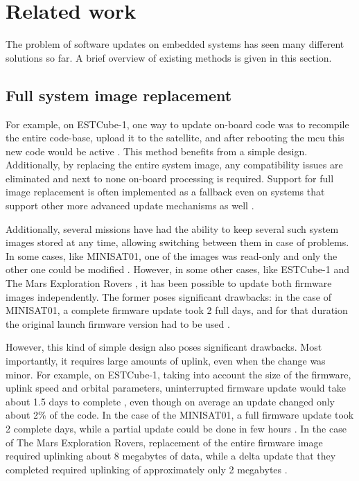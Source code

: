 \newpage
\section{Related work}
\label{s:relatedwork}

The problem
of software updates on embedded systems has seen many different solutions so far. A brief overview of existing methods is given in this section.

\subsection{Full system image replacement}

For example, on ESTCube-1, one way to update on-board code was to recompile the entire code-base, upload it to the satellite, and after rebooting the \gls{mcu} this new code would be active \cite{Suenter2016}. This method benefits from a simple design. Additionally, by replacing the entire system image, any compatibility issues are eliminated and next to none on-board processing is required. Support for full image replacement is often implemented as a fallback even on systems that support other more advanced update mechanisms as well \cite{Tarbe2013,Greco2005,Garrido1998}.

Additionally, several missions have had the ability to keep several such system images stored at any time, allowing switching between them in case of problems. In some cases, like MINISAT01, one of the images was read-only and only the other one could be modified \cite{Garrido1998}. However, in some other cases, like  ESTCube-1 \cite{Tarbe2013} and The Mars Exploration Rovers \cite{Greco2005}, it has been possible to update both firmware images independently. The former poses significant drawbacks: in the case of MINISAT01, a complete firmware update took 2 full days, and for that duration the original launch firmware version had to be used \cite{Garrido1998}.

However, this kind of simple design also poses significant drawbacks. Most importantly, it requires large amounts of uplink, even when the change was minor. For example, on ESTCube-1, taking into account the size of the firmware, uplink speed and orbital parameters, uninterrupted firmware update would take about 1.5 days to complete \cite{Suenter2014}, even though on average an update changed only about 2\% of the code. In the case of the MINISAT01, a full firmware update took 2 complete days, while a partial update could be done in few hours \cite{Garrido1998}. In the case of The Mars Exploration Rovers, replacement of the entire firmware image required uplinking about 8 megabytes of data, while a delta update that they completed required uplinking of approximately only 2 megabytes \cite{Greco2005}.

